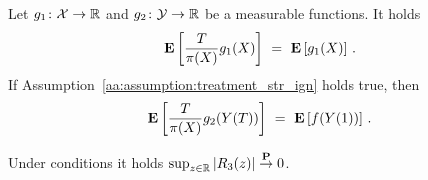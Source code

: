 \begin{lemma}
  \label{ps_weights_lemma}
  Let
  $
  g_1\colon
  \mathcal{X}\to\mathbb{R}
  $
  and
  $
  g_2\colon
  \mathcal{Y}\to\mathbb{R}
  $
  be a measurable functions.
  It holds
  \begin{gather*}
    \E
    \left[
    \frac{T}{\pi(X)}
    g_1(X)
    \right]
    \ 
    =
    \ 
    \E
    \left[
    g_1(X)
    \right]
    \,.
  \end{gather*}
  If Assumption~\ref{aa:assumption:treatment_str_ign} holds true, then
  \begin{gather*}
    \E
    \left[
    \frac{T}{\pi(X)}
    g_2(Y(T))
    \right]
    \ 
    =
    \ 
    \E
    \left[
    f(Y(1))
    \right]
    \,.
  \end{gather*}
\end{lemma}
\begin{lemma}
  \label{aa:mean:r3:lem:conv}
  Under conditions it holds
  $\sup_{z\in\mathbb{R}}\left| R_3(z) \right|\overset{\mathbf{P}}{\to}0$.
\end{lemma}
